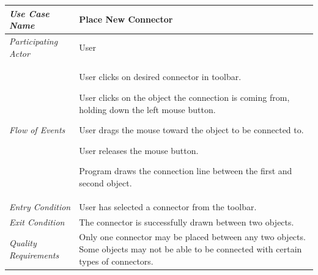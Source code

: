 \documentclass[twoside,letterpaper]{article}
\newenvironment{my_enumerate}{
\begin{enumerate}
  \setlength{\itemsep}{1pt}
  \setlength{\parskip}{0pt}
  \setlength{\parsep}{0pt}}{\end{enumerate}
}
\begin{document}
\begin{flushleft}
\tablehead{}
\begin{tabular}{|m{2.0in} m{5.0in}|}
\hline {\bfseries\emph{Use Case Name}}
& {\bfseries Place New Connector}
\\\hline
\emph{Participating Actor}
& User
\\\hline
\emph{Flow of Events}
& \begin{my_enumerate}
\item User clicks on desired connector in toolbar.
\item User clicks on the object the connection is coming from, holding down the left mouse button.
\item User drags the mouse toward the object to be connected to.
\item User releases the mouse button.
\item Program draws the connection line between the first and second object.
\end{my_enumerate}
\\\hline
\emph{Entry Condition}
& User has selected a connector from the toolbar.
\\\hline
\emph{Exit Condition}
& The connector is successfully drawn between two objects. 
\\\hline
\emph{Quality Requirements}
& Only one connector may be placed between any two objects. Some objects may not be able to be connected with certain types of connectors.
\\\hline
\end{tabular}
\end{flushleft}
\bigskip
\end{document}
